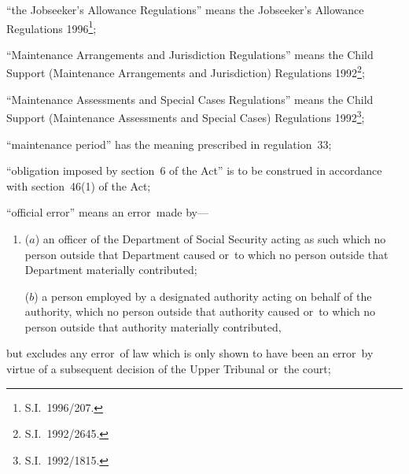 \documentclass[a4paper,12pt]{article}
\begin{document}
\begin{enumerate}
\begin{sloppypar}
“the Jobseeker’s Allowance Regulations” means the Jobseeker’s Allowance Regulations 1996\footnote{\frenchspacing S.I.~1996/207.};
\end{sloppypar}

“Maintenance Arrangements and Jurisdiction Regulations” means the Child Support (Maintenance Arrangements and Jurisdiction) Regulations 1992\footnote{\frenchspacing S.I.~1992/2645.};

“Maintenance Assessments and Special Cases Regulations” means the Child Support (Maintenance Assessments and Special Cases) Regulations 1992\footnote{\frenchspacing S.I.\ 1992/1815.};

“maintenance period” has the meaning prescribed in regulation~33;

“obligation imposed by section~6 of the Act” is to be construed in accordance with section~46(1) of the Act;


“official error” means an error~made by—
\begin{enumerate}\item[]
    ($a$) 
    an officer of the Department of Social Security acting as such which no person outside that Department caused or~to which no person outside that Department materially contributed;



($b$) a person employed by a designated authority acting on behalf of the authority, which no person outside that authority caused or~to which no person outside that authority materially contributed,
\end{enumerate}
but excludes any error~of law which is only shown to have been an error~by virtue of a subsequent decision of 
the Upper Tribunal  %
or~the court;


\end{enumerate}
\end{document}
